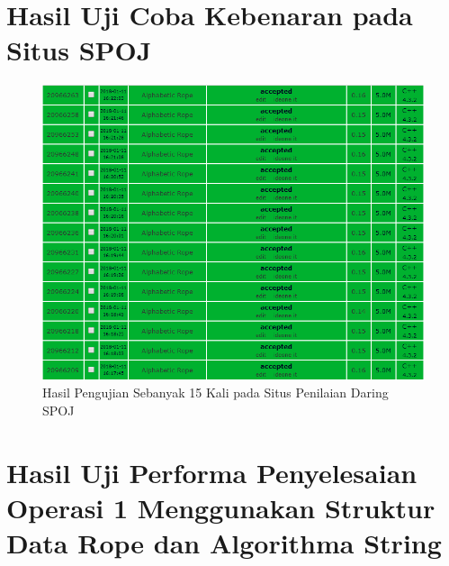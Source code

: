 \begin{appendices}

  \chapter{Hasil Uji Coba Kebenaran pada Situs SPOJ}
  \setcounter{figure}{0}
  \renewcommand{\thetable}{A.\arabic{table}}
  \renewcommand{\thefigure}{A.\arabic{figure}}
  
  \begin{figure}[H]
  	\centerline{ \includegraphics[scale=0.5]{assets/images/submission.png}}
  	\caption{Hasil Pengujian Sebanyak 15 Kali pada Situs Penilaian Daring SPOJ}
  	\label{figure:submission}
  \end{figure}
  
  \chapter{Hasil Uji Performa Penyelesaian Operasi 1 Menggunakan Struktur Data Rope dan Algorithma String}
  \setcounter{figure}{0}
  \renewcommand{\thetable}{B.\arabic{table}}
  \renewcommand{\thefigure}{B.\arabic{figure}}
  

\end{appendices}
